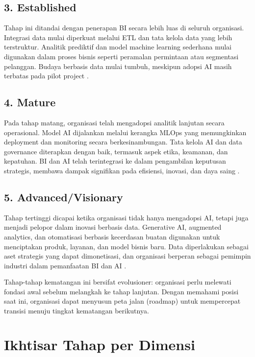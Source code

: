 \subsection*{3. Established}
Tahap ini ditandai dengan penerapan BI secara lebih luas di seluruh organisasi. 
Integrasi data mulai diperkuat melalui ETL dan tata kelola data yang lebih terstruktur. 
Analitik prediktif dan model machine learning sederhana mulai digunakan dalam proses bisnis 
seperti peramalan permintaan atau segmentasi pelanggan. Budaya berbasis data mulai tumbuh, 
meskipun adopsi AI masih terbatas pada pilot project \cite{yeoh2008biimplement, islam2017success}.  

\subsection*{4. Mature}
Pada tahap matang, organisasi telah mengadopsi analitik lanjutan secara operasional. 
Model AI dijalankan melalui kerangka MLOps yang memungkinkan deployment dan monitoring secara berkesinambungan. 
Tata kelola AI dan data governance diterapkan dengan baik, termasuk aspek etika, keamanan, 
dan kepatuhan. BI dan AI telah terintegrasi ke dalam pengambilan keputusan strategis, 
membawa dampak signifikan pada efisiensi, inovasi, dan daya saing \cite{liao2021business, lim2023adoption}.  

\subsection*{5. Advanced/Visionary}
Tahap tertinggi dicapai ketika organisasi tidak hanya mengadopsi AI, tetapi juga 
menjadi pelopor dalam inovasi berbasis data. Generative AI, augmented analytics, 
dan otomatisasi berbasis kecerdasan buatan digunakan untuk menciptakan produk, layanan, 
dan model bisnis baru. Data diperlakukan sebagai aset strategis yang dapat dimonetisasi, 
dan organisasi berperan sebagai pemimpin industri dalam pemanfaatan BI dan AI \cite{chen2021aibi, gantz2020futurebi}.  

Tahap-tahap kematangan ini bersifat evolusioner: organisasi perlu melewati fondasi awal 
sebelum melangkah ke tahap lanjutan. Dengan memahami posisi saat ini, organisasi dapat 
menyusun peta jalan (roadmap) untuk mempercepat transisi menuju tingkat kematangan berikutnya.

\section{Ikhtisar Tahap per Dimensi}

